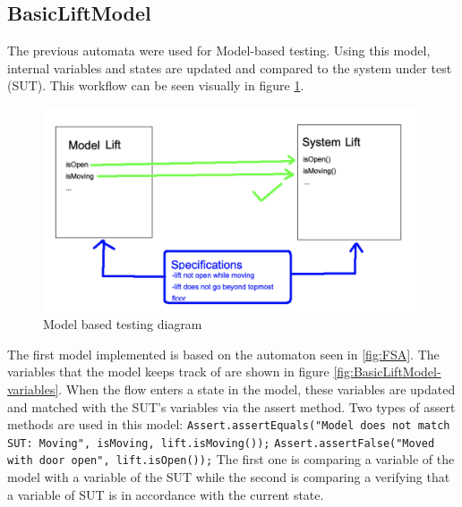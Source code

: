 \documentclass[a4paper, 12pt]{article}
\begin{document}
\subsection{BasicLiftModel}
The previous automata were used for Model-based testing. Using this model, internal variables and states are updated and compared to the system under test (SUT). This workflow can be seen visually in figure \ref{fig:model-based-testing-diag}. \\

\begin{figure}[h]
   \centering
   \includegraphics[width=\textwidth,height=\textheight,keepaspectratio]{images/model-based-testing-diag} %
   \caption{Model based testing diagram}
   \label{fig:model-based-testing-diag}
\end{figure}

The first model implemented is based on the automaton seen in \ref{fig:FSA}. The variables that the model keeps track of are shown in figure \ref{fig:BasicLiftModel-variables}. When the flow enters a state in the model, these variables are updated and matched with the SUT's variables via the assert method. Two types of assert methods are used in this model: \newline
\texttt{Assert.assertEquals("Model does not match SUT: Moving", isMoving, lift.isMoving());} \newline
\texttt{Assert.assertFalse("Moved with door open", lift.isOpen());}
The first one is comparing a variable of the model with a variable of the SUT while the second is comparing a verifying that a variable of SUT is in accordance with the current state.\\ 
\end{document}
